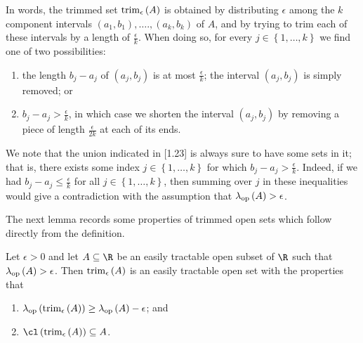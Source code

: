 \documentclass[pmath450]{subfiles}
\begin{document}
    \np In words, the trimmed set $\operatorname{trim}_{\epsilon}\left( A \right)$ is obtained by distributing $\epsilon$ among the $k$ component intervals $\left( a_1,b_1 \right),\ldots.,\left( a_k,b_k \right)$ of $A$, and by trying to trim each of these intervals by a length of $\frac{\epsilon}{k}$. When doing so, for every $j\in\left\lbrace 1,\ldots,k \right\rbrace$ we find one of two possibilities:
    \begin{enumerate}
        \item the length $b_j-a_j$ of $\left( a_j,b_j \right)$ is at most $\frac{\epsilon}{k}$; the interval $\left( a_j,b_j \right)$ is simply removed; or
        \item $b_j-a_j>\frac{\epsilon}{k}$, in which case we shorten the interval $\left( a_j,b_j \right)$ by removing a piece of length $\frac{\epsilon}{2k}$ at each of its ends.
    \end{enumerate}
    We note that the union indicated in [1.23] is always sure to have some sets in it; that is, there exists some index $j\in\left\lbrace 1,\ldots,k \right\rbrace$ for which $b_j-a_j>\frac{\epsilon}{k}$. Indeed, if we had $b_j-a_j\leq \frac{\epsilon}{k}$ for all $j\in\left\lbrace 1,\ldots,k \right\rbrace$, then summing over $j$ in these inequalities would give a contradiction with the assumption that $\lambda_{\operatorname{op}}\left( A \right)>\epsilon$.

    \np The next lemma records some properties of trimmed open sets which follow directly from the definition.

    \begin{lemma}{}
        Let $\epsilon>0$ and let $A\subseteq\R$ be an easily tractable open subset of $\R$ such that $\lambda_{\operatorname{op}}\left( A \right)>\epsilon$. Then $\operatorname{trim}_{\epsilon}\left( A \right)$ is an easily tractable open set with the properties that
        \begin{enumerate}
            \item $\lambda_{\operatorname{op}}\left( \operatorname{trim}_{\epsilon}\left( A \right) \right)\geq\lambda_{\operatorname{op}}\left( A \right)-\epsilon$; and
            \item $\cl\left( \trim_{\epsilon}\left( A \right) \right)\subseteq A$.
        \end{enumerate}
    \end{lemma}
\end{document}
